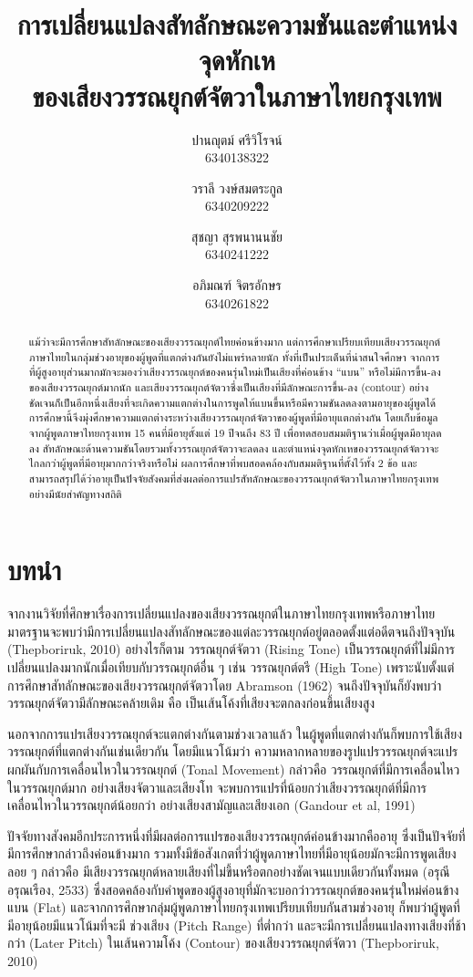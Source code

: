 \documentclass[a4paper]{article}
\title{การเปลี่ยนแปลงสัทลักษณะความชันและตำแหน่งจุดหักเห\\ของเสียงวรรณยุกต์จัตวาในภาษาไทยกรุงเทพ}
\author{
    ปานญุตม์ ศรีวิโรจน์\\6340138322
    \and
    วราลี วงษ์สมตระกูล\\6340209222
    \and
    สุชญา สุรพนานนชัย\\6340241222
    \and
    อภิมณฑ์ จิตรอักษร\\6340261822
}
\date{}
\begin{document}
\maketitle
\begin{abstract}
    แม้ว่าจะมีการศึกษาสัทลักษณะของเสียงวรรณยุกต์ไทยค่อนข้างมาก แต่การศึกษาเปรียบเทียบเสียงวรรณยุกต์ภาษาไทยในกลุ่มช่วงอายุของผู้พูดที่แตกต่างกันยังไม่แพร่หลายนัก ทั้งที่เป็นประเด็นที่น่าสนใจศึกษา จากการที่ผู้สูงอายุส่วนมากมักจะมองว่าเสียงวรรณยุกต์ของคนรุ่นใหม่เป็นเสียงที่ค่อนข้าง “แบน” หรือไม่มีการขึ้น-ลงของเสียงวรรณยุกต์มากนัก และเสียงวรรณยุกต์จัตวาซึ่งเป็นเสียงที่มีลักษณะการขึ้น-ลง (contour) อย่างชัดเจนก็เป็นอีกหนึ่งเสียงที่จะเกิดความแตกต่างในการพูดให้แบนขึ้นหรือมีความชันลดลงตามอายุของผู้พูดได้ การศึกษานี้จึงมุ่งศึกษาความแตกต่างระหว่างเสียงวรรณยุกต์จัตวาของผู้พูดที่มีอายุแตกต่างกัน โดยเก็บข้อมูลจากผู้พูดภาษาไทยกรุงเทพ 15 คนที่มีอายุตั้งแต่ 19 ปีจนถึง 83 ปี เพื่อทดสอบสมมติฐานว่าเมื่อผู้พูดมีอายุลดลง สัทลักษณะด้านความชันโดยรวมทั้งวรรณยุกต์จัตวาจะลดลง และตำแหน่งจุดหักเหของวรรณยุกต์จัตวาจะไกลกว่าผู้พูดที่มีอายุมากกว่าจริงหรือไม่ ผลการศึกษาที่พบสอดคล้องกับสมมติฐานที่ตั้งไว้ทั้ง 2 ข้อ และสามารถสรุปได้ว่าอายุเป็นปัจจัยสังคมที่ส่งผลต่อการแปรสัทลักษณะของวรรณยุกต์จัตวาในภาษาไทยกรุงเทพอย่างมีนัยสำคัญทางสถิติ
\end{abstract}
\section{บทนำ}
    จากงานวิจัยที่ศึกษาเรื่องการเปลี่ยนแปลงของเสียงวรรณยุกต์ในภาษาไทยกรุงเทพหรือภาษาไทยมาตรฐานจะพบว่ามีการเปลี่ยนแปลงสัทลักษณะของแต่ละวรรณยุกต์อยู่ตลอดตั้งแต่อดีตจนถึงปัจจุบัน (Thepboriruk, 2010) อย่างไรก็ตาม วรรณยุกต์จัตวา (Rising Tone) เป็นวรรณยุกต์ที่ไม่มีการเปลี่ยนแปลงมากนักเมื่อเทียบกับวรรณยุกต์อื่น ๆ เช่น วรรณยุกต์ตรี (High Tone) เพราะนับตั้งแต่การศึกษาสัทลักษณะของเสียงวรรณยุกต์จัตวาโดย Abramson (1962) จนถึงปัจจุบันก็ยังพบว่าวรรณยุกต์จัตวามีลักษณะคล้ายเดิม คือ เป็นเส้นโค้งที่เสียงจะตกลงก่อนขึ้นเสียงสูง

    นอกจากการแปรเสียงวรรณยุกต์จะแตกต่างกันตามช่วงเวลาแล้ว ในผู้พูดที่แตกต่างกันก็พบการใช้เสียงวรรณยุกต์ที่แตกต่างกันเช่นเดียวกัน โดยมีแนวโน้มว่า ความหลากหลายของรูปแปรวรรณยุกต์จะแปรผกผันกับการเคลื่อนไหวในวรรณยุกต์ (Tonal Movement) กล่าวคือ วรรณยุกต์ที่มีการเคลื่อนไหวในวรรณยุกต์มาก อย่างเสียงจัตวาและเสียงโท จะพบการแปรที่น้อยกว่าเสียงวรรณยุกต์ที่มีการเคลื่อนไหวในวรรณยุกต์น้อยกว่า อย่างเสียงสามัญและเสียงเอก (Gandour et al, 1991)

    ปัจจัยทางสังคมอีกประการหนึ่งที่มีผลต่อการแปรของเสียงวรรณยุกต์ค่อนข้างมากคืออายุ ซึ่งเป็นปัจจัยที่มีการศึกษากล่าวถึงค่อนข้างมาก รวมทั้งมีข้อสังเกตที่ว่าผู้พูดภาษาไทยที่มีอายุน้อยมักจะมีการพูดเสียงลอย ๆ กล่าวคือ มีเสียงวรรณยุกต์หลายเสียงที่ไม่ขึ้นหรือตกอย่างชัดเจนแบบเดียวกันทั้งหมด (อรุณี อรุณเรือง, 2533) ซึ่งสอดคล้องกับคำพูดของผู้สูงอายุที่มักจะบอกว่าวรรณยุกต์ของคนรุ่นใหม่ค่อนข้างแบน (Flat) และจากการศึกษากลุ่มผู้พูดภาษาไทยกรุงเทพเปรียบเทียบกันสามช่วงอายุ ก็พบว่าผู้พูดที่มีอายุน้อยมีแนวโน้มที่จะมี ช่วงเสียง (Pitch Range) ที่ต่ำกว่า และจะมีการเปลี่ยนแปลงทางเสียงที่ช้ากว่า (Later Pitch) ในเส้นความโค้ง (Contour) ของเสียงวรรณยุกต์จัตวา (Thepboriruk, 2010)
\end{document}
